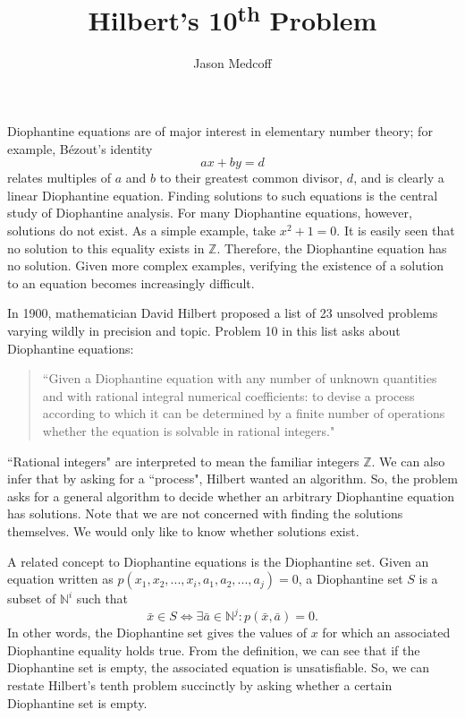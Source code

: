 \documentclass[12pt]{amsart}
\title{Hilbert's 10\textsuperscript{th} Problem}
\author{Jason Medcoff}
\theoremstyle{case}
\begin{document}
	
	\maketitle
	
	Diophantine equations are of major interest in elementary number theory; for example, B\'{e}zout's identity
	$$ ax + by = d $$
	relates multiples of $a$ and $b$ to their greatest common divisor, $d$, and is clearly a linear Diophantine equation. Finding solutions to such equations is the central study of Diophantine analysis. For many Diophantine equations, however, solutions do not exist. As a simple example, take $x^2 + 1 = 0$. It is easily seen that no solution to this equality exists in $\mathbb{Z}$. Therefore, the Diophantine equation has no solution. Given more complex examples, verifying the existence of a solution to an equation becomes increasingly difficult.
	
	In 1900, mathematician David Hilbert proposed a list of 23 unsolved problems varying wildly in precision and topic. Problem 10 in this list asks about Diophantine equations:
	\begin{quotation}
		``Given a Diophantine equation with any number of unknown quantities and with rational integral numerical coefficients: to devise a process according to which it can be determined by a finite number of operations whether the equation is solvable in rational integers."
	\end{quotation}
	``Rational integers" are interpreted to mean the familiar integers $\mathbb{Z}$. We can also infer that by asking for a ``process", Hilbert wanted an algorithm. So, the problem asks for a general algorithm to decide whether an arbitrary Diophantine equation has solutions. Note that we are not concerned with finding the solutions themselves. We would only like to know whether solutions exist.
	
	A related concept to Diophantine equations is the Diophantine set. Given an equation written as $p(x_1,x_2,...,x_i,a_1,a_2,...,a_j)=0$, a Diophantine set $S$ is a subset of $\mathbb{N}^i$ such that
	$$ \bar{x} \in S \iff \exists \bar{a} \in \mathbb{N}^j : p(\bar{x}, \bar{a}) = 0 . $$
	In other words, the Diophantine set gives the values of $x$ for which an associated Diophantine equality holds true. From the definition, we can see that if the Diophantine set is empty, the associated equation is unsatisfiable. So, we can restate Hilbert's tenth problem succinctly by asking whether a certain Diophantine set is empty.
	
\end{document}
